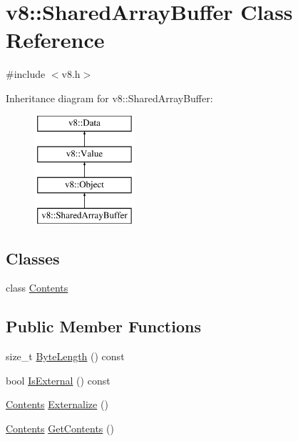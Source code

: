 \hypertarget{classv8_1_1SharedArrayBuffer}{}\section{v8\+:\+:Shared\+Array\+Buffer Class Reference}
\label{classv8_1_1SharedArrayBuffer}


{\ttfamily \#include $<$v8.\+h$>$}

Inheritance diagram for v8\+:\+:Shared\+Array\+Buffer\+:\begin{figure}[H]
\begin{center}
\leavevmode
\includegraphics[height=4.000000cm]{classv8_1_1SharedArrayBuffer}
\end{center}
\end{figure}
\subsection*{Classes}
\begin{DoxyCompactItemize}
\item 
class \mbox{\hyperlink{classv8_1_1SharedArrayBuffer_1_1Contents}{Contents}}
\end{DoxyCompactItemize}
\subsection*{Public Member Functions}
\begin{DoxyCompactItemize}
\item 
size\+\_\+t \mbox{\hyperlink{classv8_1_1SharedArrayBuffer_a746f2632ad6c2d80e8f2e5e6e5b77f94}{Byte\+Length}} () const
\item 
bool \mbox{\hyperlink{classv8_1_1SharedArrayBuffer_adcbceac6432955c7d54fceea27c92b73}{Is\+External}} () const
\item 
\mbox{\hyperlink{classv8_1_1SharedArrayBuffer_1_1Contents}{Contents}} \mbox{\hyperlink{classv8_1_1SharedArrayBuffer_afe025bbf668e64439cfc0044b353eb41}{Externalize}} ()
\item 
\mbox{\hyperlink{classv8_1_1SharedArrayBuffer_1_1Contents}{Contents}} \mbox{\hyperlink{classv8_1_1SharedArrayBuffer_af5a160b645c5c674450d9501697c2cf4}{Get\+Contents}} ()
\end{DoxyCompactItemize}
